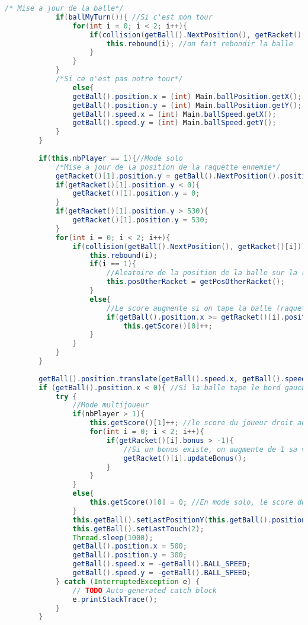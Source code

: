 \begin{lstlisting}[language=Java]
			/* Mise a jour de la balle*/
			if(ballMyTurn()){ //Si c'est mon tour
				for(int i = 0; i < 2; i++){
					if(collision(getBall().NextPosition(), getRacket()[i])){ //Et qu'il y a collision
						this.rebound(i); //on fait rebondir la balle
					}
				}
			}
			/*Si ce n'est pas notre tour*/
				else{
				getBall().position.x = (int) Main.ballPosition.getX();
				getBall().position.y = (int) Main.ballPosition.getY();
				getBall().speed.x = (int) Main.ballSpeed.getX();
				getBall().speed.y = (int) Main.ballSpeed.getY();
			}
		}
		
		if(this.nbPlayer == 1){//Mode solo
			/*Mise a jour de la position de la raquette ennemie*/
			getRacket()[1].position.y = getBall().NextPosition().position.y - this.posOtherRacket + 1;
			if(getRacket()[1].position.y < 0){
				getRacket()[1].position.y = 0;
			}
			if(getRacket()[1].position.y > 530){
				getRacket()[1].position.y = 530;
			}
			for(int i = 0; i < 2; i++){
				if(collision(getBall().NextPosition(), getRacket()[i])){
					this.rebound(i);
					if(i == 1){
						//Aleatoire de la position de la balle sur la raquette (raquette droite)
						this.posOtherRacket = getPosOtherRacket(); 
					}
					else{
						//Le score augmente si on tape la balle (raquette gauche)
						if(getBall().position.x >= getRacket()[i].position.x + getRacket()[i].width)
							this.getScore()[0]++; 
					}
				}
			}
		}
		
		getBall().position.translate(getBall().speed.x, getBall().speed.y);
		if (getBall().position.x < 0){ //Si la balle tape le bord gauche de l'ecran
			try {
				//Mode multijoueur
				if(nbPlayer > 1){ 
					this.getScore()[1]++; //le score du joueur droit augmente
					for(int i = 0; i < 2; i++){
						if(getRacket()[i].bonus > -1){
							//Si un bonus existe, on augmente de 1 sa variable bonus (disparait apres 2 tours)
							getRacket()[i].updateBonus(); 
						}
					}
				}
				else{
					this.getScore()[0] = 0; //En mode solo, le score du joueur repart a 0
				}
				this.getBall().setLastPositionY(this.getBall().position.y);
				this.getBall().setLastTouch(2);
				Thread.sleep(1000);
				getBall().position.x = 500;
				getBall().position.y = 300;
				getBall().speed.x = -getBall().BALL_SPEED;
				getBall().speed.y = -getBall().BALL_SPEED;
			} catch (InterruptedException e) {
				// TODO Auto-generated catch block
				e.printStackTrace();
			}
		}
		

\end{lstlisting}
